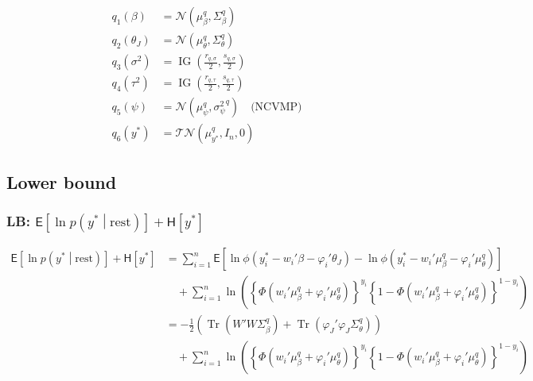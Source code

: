 \documentclass[11pt]{article}
\DeclareMathOperator{\Tr}{Tr}
\newcommand{\opn}{\operatorname}
\begin{document}
\begin{align*}
  q_{1}\left(\beta\right) &= \mathcal{N}\left(\mu_{\beta}^{q}, \Sigma_{\beta}^{q}\right)\\
  q_{2}\left(\theta_{J}\right) &= \mathcal{N}\left(\mu_{\theta}^{q},\Sigma_{\theta}^{q}\right)\\
  q_{3}\left(\sigma^{2}\right) &= \opn{IG}\left(\frac{r_{q,\sigma}}{2},\frac{s_{q,\sigma}}{2}\right)\\
  q_{4}\left(\tau^{2}\right) &= \opn{IG}\left(\frac{r_{q,\tau}}{2},\frac{s_{q,\tau}}{2}\right)\\
  q_{5}\left(\psi\right) &= \mathcal{N}\left(\mu_{\psi}^{q}, {\sigma_{\psi}^{2}}^{q}\right) \quad \text{(NCVMP)}\\
  q_{6}\left(y^{*}\right) &= \mathcal{TN}\left(\mu_{y^{*}}^{q}, I_{n},0\right)
\end{align*}
\subsection{Lower bound}
\subsubsection{LB: $\mathsf{E}\left[\ln p\left(y^{*}\middle|\text{rest}\right)\right]+\mathsf{H}\left[y^{*}\right]$}
\begin{align*}
  \mathsf{E}\left[\ln p\left(y^{*}\middle|\text{rest}\right)\right]+\mathsf{H}\left[y^{*}\right] &= \sum_{i=1}^{n}\mathsf{E}\left[\ln \phi\left(y_{i}^{*}-w_{i}'\beta-\varphi_{i}'\theta_{J}\right)-\ln \phi\left(y_{i}^{*}-w_{i}'\mu_{\beta}^{q}-\varphi_{i}'\mu_{\theta}^{q}\right) \right]\\
  &\quad +\sum_{i=1}^{n}\ln\left(\left\{\Phi\left(w_{i}'\mu_{\beta}^{q}+\varphi_{i}'\mu_{\theta}^{q}\right) \right\}^{y_{i}}\left\{1-\Phi\left(w_{i}'\mu_{\beta}^{q}+\varphi_{i}'\mu_{\theta}^{q}\right) \right\}^{1-y_{i}} \right)\\
  &= -\frac{1}{2}\left(\Tr\left(W'W\Sigma_{\beta}^{q}\right)+\Tr\left(\varphi_{J}'\varphi_{J}\Sigma_{\theta}^{q}\right)\right)\\
  &\quad +\sum_{i=1}^{n}\ln\left(\left\{\Phi\left(w_{i}'\mu_{\beta}^{q}+\varphi_{i}'\mu_{\theta}^{q}\right) \right\}^{y_{i}}\left\{1-\Phi\left(w_{i}'\mu_{\beta}^{q}+\varphi_{i}'\mu_{\theta}^{q}\right) \right\}^{1-y_{i}} \right)
\end{align*}
\end{document}
